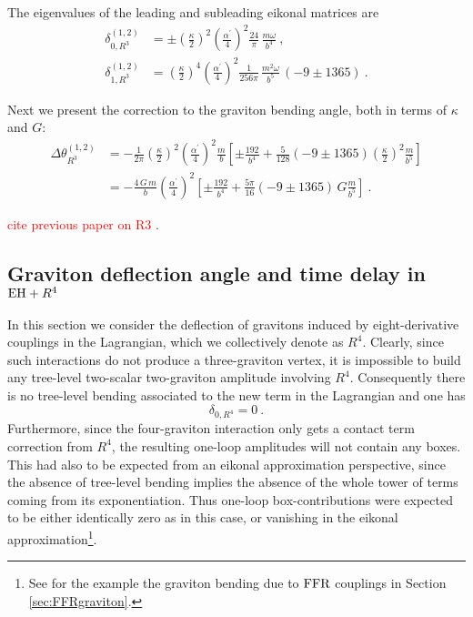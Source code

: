 \documentclass[a4paper,11pt]{article}
\numberwithin{equation}{section}
\begin{document}
The eigenvalues of the leading and subleading eikonal matrices are
\begin{align}
    \delta_{0,R^3}^{(1,2)} &= \pm \left( \frac{\kappa}{2}\right)^2 \left( \frac{\alpha^\prime}{4}\right)^2 \frac{24}{\pi} \, \frac{m \omega}{b^4}\ , \\[.2em]
    \delta_{1,R^3}^{(1,2)} &= \left( \frac{\kappa}{2}\right)^4 \left( \frac{\alpha^\prime}{4}\right)^2 \frac{1}{256\pi}\, \frac{m^2 \omega}{b^5}\, \left( - 9 \pm 1365 \right)\ .
\end{align}

Next we present the correction to the graviton bending angle, both in terms of $\kappa$ and $G$:
\begin{equation}
    \begin{split}
        \Delta\theta_{R^3}^{(1,2)} & = - \frac{1}{2\pi} \left( \frac{\kappa}{2}\right)^2 \left( \frac{\alpha^\prime}{4}\right)^2\frac{m}{b} \left[ \pm  \frac{192}{b^4} + \frac{5}{128} (-9 \pm 1365) \left( \frac{\kappa}{2}\right)^2\frac{m}{b^5} \right]\\[.2em]
        & = - \frac{4\, G\, m}{b}  \left(\frac{\alpha^\prime}{4}\right)^2\left[ \pm  \frac{192}{b^4} + \frac{5\pi}{16} (-9 \pm 1365)\,  G \frac{m}{b^5} \right] \ .
    \end{split}
\end{equation}

\textcolor{red}{cite previous paper on R3} \cite{Brandhuber:2019qpg}.

\subsection{Graviton deflection angle and time delay in \texorpdfstring{${\rm EH} + R^4$}{EH + R4}}\label{sec:R4bending}

In this section we consider the deflection of gravitons induced by eight-derivative couplings in the Lagrangian, which we collectively denote as $R^4$. Clearly, since such interactions do not produce a three-graviton vertex, it is impossible to build any tree-level two-scalar two-graviton amplitude involving $R^4$. Consequently there is no tree-level bending associated to the new term in the Lagrangian and one has
\begin{equation}
\delta_{0,R^4}= 0\ .
\end{equation}
Furthermore, since the four-graviton interaction only gets a contact term correction from $R^4$, the resulting one-loop amplitudes will not contain any boxes. This had also to be expected from an eikonal approximation perspective, since the absence of tree-level bending implies the absence of the whole tower of terms coming from its exponentiation. Thus one-loop box-contributions were expected to be either identically zero as in this case, or vanishing in the eikonal approximation\footnote{See for the example the graviton bending due to $\rm FFR$ couplings in Section \ref{sec:FFRgraviton}.}.
\end{document}
